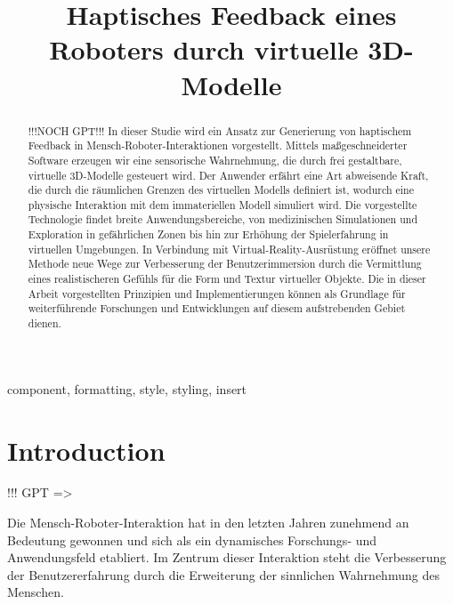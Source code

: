 \documentclass[conference]{IEEEtran}
\begin{document}
\title{Haptisches Feedback eines Roboters durch virtuelle 3D-Modelle}

\author{
    \and
}
\maketitle

\begin{abstract}
!!!NOCH GPT!!!
In dieser Studie wird ein Ansatz zur Generierung von haptischem Feedback in Mensch-Roboter-Interaktionen vorgestellt. Mittels maßgeschneiderter Software erzeugen wir eine sensorische Wahrnehmung, die durch frei gestaltbare, virtuelle 3D-Modelle gesteuert wird. Der Anwender erfährt eine Art abweisende Kraft, die durch die räumlichen Grenzen des virtuellen Modells definiert ist, wodurch eine physische Interaktion mit dem immateriellen Modell simuliert wird. Die vorgestellte Technologie findet breite Anwendungsbereiche, von medizinischen Simulationen und Exploration in gefährlichen Zonen bis hin zur Erhöhung der Spielerfahrung in virtuellen Umgebungen. In Verbindung mit Virtual-Reality-Ausrüstung eröffnet unsere Methode neue Wege zur Verbesserung der Benutzerimmersion durch die Vermittlung eines realistischeren Gefühls für die Form und Textur virtueller Objekte. Die in dieser Arbeit vorgestellten Prinzipien und Implementierungen können als Grundlage für weiterführende Forschungen und Entwicklungen auf diesem aufstrebenden Gebiet dienen.
\end{abstract}

\begin{IEEEkeywords}
    component, formatting, style, styling, insert
\end{IEEEkeywords}

\section{Introduction}
!!! GPT =>

Die Mensch-Roboter-Interaktion hat in den letzten Jahren zunehmend an Bedeutung gewonnen und sich als ein dynamisches Forschungs- und Anwendungsfeld etabliert. Im Zentrum dieser Interaktion steht die Verbesserung der Benutzererfahrung durch die Erweiterung der sinnlichen Wahrnehmung des Menschen.
\end{document}
